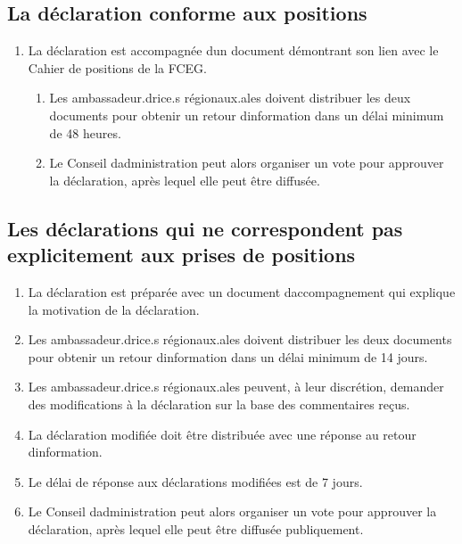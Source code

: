 \subsection{La déclaration conforme aux positions}
\label{la-declaration-conforme-aux-positions}

\begin{enumerate}
 \item
  La déclaration est accompagnée d\textquotesingle un document démontrant son lien avec le Cahier de positions de la FCEG.

  \begin{enumerate}
   \item
    Les ambassadeur.drice.s régionaux.ales doivent distribuer les deux documents pour obtenir un retour d\textquotesingle information dans un délai minimum de 48 heures.
   \item
    Le Conseil d\textquotesingle administration peut alors organiser un vote pour approuver la déclaration, après lequel elle peut être diffusée.
  \end{enumerate}
\end{enumerate}

\subsection{Les déclarations qui ne correspondent pas explicitement aux prises de positions}
\label{les-declarations-qui-ne-correspondent-pas-explicitement-aux-prises-de-positions}

\begin{enumerate}
 \item
  La déclaration est préparée avec un document d\textquotesingle accompagnement qui explique la motivation de la déclaration.
 \item
  Les ambassadeur.drice.s régionaux.ales doivent distribuer les deux documents pour obtenir un retour d\textquotesingle information dans un délai minimum de 14 jours.
 \item
  Les ambassadeur.drice.s régionaux.ales peuvent, à leur discrétion, demander des modifications à la déclaration sur la base des commentaires reçus.
 \item
  La déclaration modifiée doit être distribuée avec une réponse au retour d\textquotesingle information.
 \item
  Le délai de réponse aux déclarations modifiées est de 7 jours.
 \item
  Le Conseil d\textquotesingle administration peut alors organiser un vote pour approuver la déclaration, après lequel elle peut être diffusée publiquement.
\end{enumerate}

